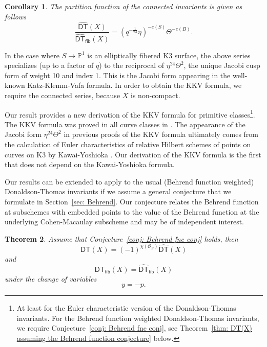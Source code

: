 \documentclass[12pt]{amsart}
\newtheorem{theorem}{Theorem}%
\newtheorem{corollary}[theorem]{Corollary}
\theoremstyle{definition}
\newcommand{\PP} {\mathbb{P}}
\renewcommand{\O}{\mathcal{O}}
\newcommand{\DT}{\mathsf{DT}}
\newcommand{\DThat}{\widehat{\DT}}
\newcommand{\fiber}{\mathsf{fib}}
\begin{document}
\begin{corollary} The partition function of the connected invariants is given as follows
\[
\frac{\DThat (X)}{\DThat_{\fiber}(X)}=
\left(q^{-\frac{1}{24}}\eta  \right)^{-e(S)}\Theta^{-e(B)}.
\]
\end{corollary}

In the case where $S \rightarrow \PP^1$ is an elliptically fibered
K3 surface, the above series specializes (up to a factor of $q$) to
the reciprocal of $\eta^{24}\Theta^{2}$, the unique Jacobi cusp form
of weight 10 and index 1. This is the Jacobi form appearing in the
well-known Katz-Klemm-Vafa formula. In order to obtain the KKV 
formula, we require the connected series, because $X$ is non-compact. 

Our result provides a new derivation of the KKV formula for primitive
classes\footnote{At least for the Euler characteristic version of the
Donaldson-Thomas invariants. For the Behrend function weighted
Donaldson-Thomas invariants, we require Conjecture~\ref{conj: Behrend
fnc conj}, see Theorem~\ref{thm: DT(X) assuming the Behrend function
conjecture} below.}. The KKV formula was proved in all curve classes
in \cite{Pandharipande-Thomas-KKV}. The appearance of the Jacobi form
$\eta^{24} \Theta^{2}$ in previous proofs of the KKV formula 
\cite{Maulik-Pandharipande-Thomas, Pandharipande-Thomas-KKV}
ultimately comes from the calculation of Euler characteristics 
of relative Hilbert schemes of points on curves on K3 by Kawai-Yoshioka 
\cite{Kawai-Yoshioka}. Our derivation of the KKV formula is the first that 
does not depend on the Kawai-Yoshioka formula.

Our results can be extended to apply to the usual (Behrend function
weighted) Donaldson-Thomas invariants if we assume a general
conjecture that we formulate in Section~\ref{sec: Behrend}. Our
conjecture relates the Behrend function at subschemes with embedded
points to the value of the Behrend function at the underlying
Cohen-Macaulay subscheme and may be of independent interest.

\begin{theorem}\label{thm: DT(X) assuming the Behrend function conjecture}
Assume that Conjecture~\ref{conj: Behrend fnc conj} holds, then
\[
\DT (X) = (-1)^{\chi (\O_{S})} \DThat (X)
\]
and
\[
\DT_{\fiber } (X) =  \DThat_{\fiber } (X)
\]
under the change of variables
\[
y=-p.
\]
\end{theorem}
\end{document}
